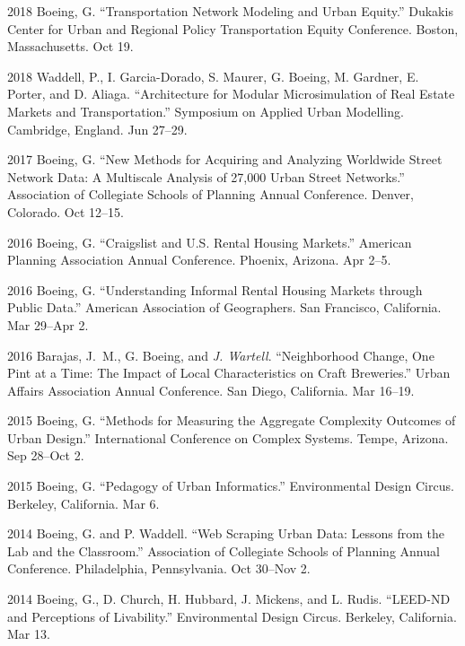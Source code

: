 \documentclass[12pt,letterpaper]{report}
\begin{document}
\begin{tablist}
        \item[2018] \tab Boeing, G. \enquote{Transportation Network Modeling and Urban Equity.} Dukakis Center for Urban and Regional Policy Transportation Equity Conference. Boston, Massachusetts. Oct 19.

        \item[2018] \tab Waddell, P., I. Garcia-Dorado, S. Maurer, G. Boeing, M. Gardner, E. Porter, and D. Aliaga. \enquote{Architecture for Modular Microsimulation of Real Estate Markets and Transportation.} Symposium on Applied Urban Modelling. Cambridge, England. Jun 27--29.

        \item[2017] \tab Boeing, G. \enquote{New Methods for Acquiring and Analyzing Worldwide Street Network Data: A Multiscale Analysis of 27,000 Urban Street Networks.} Association of Collegiate Schools of Planning Annual Conference. Denver, Colorado. Oct 12--15.

        \item[2016] \tab Boeing, G. \enquote{Craigslist and U.S. Rental Housing Markets.} American Planning Association Annual Conference. Phoenix, Arizona. Apr 2--5.

        \item[2016] \tab Boeing, G. \enquote{Understanding Informal Rental Housing Markets through Public Data.} American Association of Geographers. San Francisco, California. Mar 29--Apr 2.

        \item[2016] \tab Barajas, J.~M., G. Boeing, and \textit{J. Wartell}. \enquote{Neighborhood Change, One Pint at a Time: The Impact of Local Characteristics on Craft Breweries.} Urban Affairs Association Annual Conference. San Diego, California. Mar 16--19.

        \item[2015] \tab Boeing, G. \enquote{Methods for Measuring the Aggregate Complexity Outcomes of Urban Design.} International Conference on Complex Systems. Tempe, Arizona. Sep 28--Oct 2.

        \item[2015] \tab Boeing, G. \enquote{Pedagogy of Urban Informatics.} Environmental Design Circus. Berkeley, California. Mar 6.

        \item[2014] \tab Boeing, G. and P. Waddell. \enquote{Web Scraping Urban Data: Lessons from the Lab and the Classroom.} Association of Collegiate Schools of Planning Annual Conference. Philadelphia, Pennsylvania. Oct 30--Nov 2.

        \item[2014] \tab Boeing, G., D. Church, H. Hubbard, J. Mickens, and L. Rudis. \enquote{LEED-ND and Perceptions of Livability.} Environmental Design Circus. Berkeley, California. Mar 13.

    \end{tablist}
\end{document}

